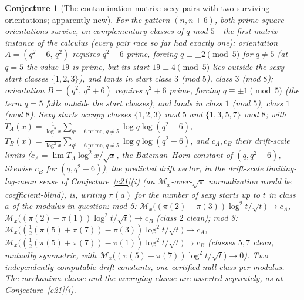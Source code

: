 \documentclass[11pt]{article}
\newtheorem{conjecture}{Conjecture}
\theoremstyle{definition}
\newcommand{\M}{\mathcal M}
\begin{document}
\setcounter{conjecture}{18}%
\begin{conjecture}[The contamination matrix: sexy pairs with two
surviving orientations; apparently new]\label{c7}
For the pattern $(n,n+6)$, \emph{both} prime-square orientations
survive, on complementary classes of $q$ mod $5$---the first matrix
instance of the calculus (every pair race so far had exactly one):
orientation $A=(q^2-6,\,q^2)$ requires $q^2-6$ prime, forcing
$q\equiv\pm2\pmod5$ for $q\neq5$ (at $q=5$ the value $19$ is prime,
but its start $19\equiv4\pmod5$ lies outside the sexy start classes
$\{1,2,3\}$), and lands in start class $3$ (mod $5$), class
$3$ (mod $8$); orientation $B=(q^2,\,q^2+6)$ requires $q^2+6$ prime,
forcing $q\equiv\pm1\pmod5$ (the term $q=5$ falls outside the start
classes), and lands in class $1$ (mod $5$), class $1$ (mod $8$).
Sexy starts occupy classes $\{1,2,3\}$ mod $5$ and $\{1,3,5,7\}$ mod
$8$; with
$T_{A}(x)=\frac1{\log^2x}\sum_{q^2-6\ \mathrm{prime},\,q\neq5}\log
q\log(q^2-6)$,
$T_{B}(x)=\frac1{\log^2x}\sum_{q^2+6\ \mathrm{prime},\,q\neq5}\log
q\log(q^2+6)$, and $c_A,c_B$ their drift-scale limits
($c_A=\lim T_A\log^2x/\sqrt x$, the Bateman--Horn constant of
$(q,q^2-6)$, likewise $c_B$ for $(q,q^2+6)$), the predicted drift
vector, in the drift-scale limiting-log-mean sense of
Conjecture~\ref{c21}(i) (an $\M_x$-over-$\sqrt\pi$ normalization would be coefficient-blind), is, writing $\pi(a)$ for the number of sexy starts up to $t$ in class $a$ of the modulus in question:
mod 5: $\M_x\bigl((\pi(2)-\pi(3))\log^2t/\sqrt t\bigr)\to c_A$,
$\M_x\bigl((\pi(2)-\pi(1))\log^2t/\sqrt t\bigr)\to c_B$ (class $2$
\emph{clean}); mod 8:
$\M_x\bigl((\tfrac12(\pi(5)+\pi(7))-\pi(3))\log^2t/\sqrt t\bigr)\to
c_A$,
$\M_x\bigl((\tfrac12(\pi(5)+\pi(7))-\pi(1))\log^2t/\sqrt t\bigr)\to
c_B$ (classes $5,7$ clean, mutually symmetric, with
$\M_x\bigl((\pi(5)-\pi(7))\log^2t/\sqrt t\bigr)\to0$).  Two
independently computable drift constants,
one certified null class per modulus.  The mechanism clause and the
averaging clause are asserted separately, as at
Conjecture~\ref{c21}(i).
\end{conjecture}
\end{document}
